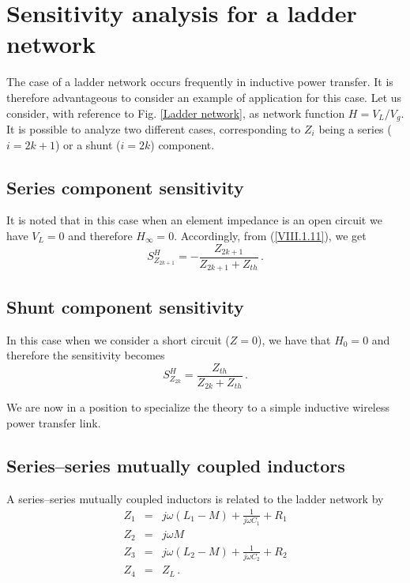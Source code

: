\documentclass[journal]{IEEEtran}
\begin{document}
\section{Sensitivity analysis for a ladder network}
The case of a ladder network occurs frequently in inductive power transfer. It is therefore advantageous to consider an example of application for this case.
Let us consider, with reference to Fig. \ref{Ladder network}, as network function $H=V_L / V_g$.
It is possible to analyze two different cases, corresponding to $Z_i$ being a series ($i=2k+1$) or a shunt ($i=2k$) component.
\subsection{Series component sensitivity}
It is noted that in this case when an element impedance is an open circuit we have $V_L=0$  and therefore $H_\infty=0$. Accordingly, from (\ref{VIII.1.11}), we get
%
\begin{equation}
S^H_{Z_{2k+1}} = - \frac{Z_{2k+1}}{Z_{2k+1}+Z_{th}}\, .
\label{series_sensitivity}
\end{equation}

\subsection{Shunt component sensitivity}
In this case when we consider a short circuit ($Z=0$), we have that $H_0=0$ and therefore the sensitivity becomes
\begin{equation}
S^H_{Z_{2k}} =  \frac{Z_{th}}{Z_{2k}+Z_{th}}\, .
\label{shunt_sensitivity}
\end{equation}

We are now in a position to specialize the theory to a simple inductive wireless power transfer link.

\subsection{Series--series mutually coupled inductors}
A series--series mutually coupled inductors is related to the ladder network by
%
\begin{eqnarray}
Z_1  & = & j\omega (L_1-M) + \frac{1}{j \omega C_1} + R_1 \nonumber \\
Z_2  & = & j\omega M \nonumber \\
Z_3  & = & j\omega (L_2-M) + \frac{1}{j \omega C_2} + R_2 \nonumber \\
Z_4  & = & Z_L \, .
\end{eqnarray}
%
\end{document}
